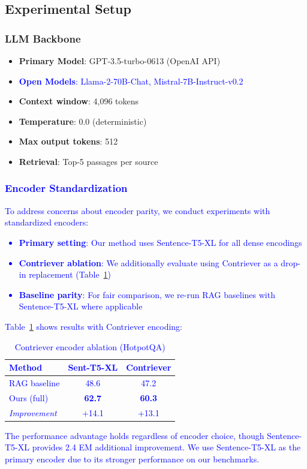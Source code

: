 \documentclass[10pt,twocolumn]{article}
\newcommand{\revision}[1]{\textcolor{blue}{#1}}
\begin{document}
\subsection{Experimental Setup}

\subsubsection{LLM Backbone}
\begin{itemize}
    \item \textbf{Primary Model}: GPT-3.5-turbo-0613 (OpenAI API)
    \item \revision{\textbf{Open Models}: Llama-2-70B-Chat, Mistral-7B-Instruct-v0.2}
    \item \textbf{Context window}: 4,096 tokens
    \item \textbf{Temperature}: 0.0 (deterministic)
    \item \textbf{Max output tokens}: 512
    \item \textbf{Retrieval}: Top-5 passages per source
\end{itemize}

\revision{
\subsubsection{Encoder Standardization}
\label{sec:encoder_standard}

To address concerns about encoder parity, we conduct experiments with standardized encoders:

\begin{itemize}
    \item \textbf{Primary setting}: Our method uses Sentence-T5-XL for all dense encodings
    \item \textbf{Contriever ablation}: We additionally evaluate using Contriever \cite{izacard2022contriever} as a drop-in replacement (Table~\ref{tab:contriever_ablation})
    \item \textbf{Baseline parity}: For fair comparison, we re-run RAG baselines with Sentence-T5-XL where applicable
\end{itemize}

Table~\ref{tab:contriever_ablation} shows results with Contriever encoding:

\begin{table}[h]
\centering
\caption{Contriever encoder ablation (HotpotQA)}
\label{tab:contriever_ablation}
\small
\begin{tabular}{@{}lcc@{}}
\toprule
\textbf{Method} & \textbf{Sent-T5-XL} & \textbf{Contriever} \\
\midrule
RAG baseline & 48.6 & 47.2 \\
Ours (full) & \textbf{62.7} & \textbf{60.3} \\
\midrule
\textit{Improvement} & +14.1 & +13.1 \\
\bottomrule
\end{tabular}
\end{table}

The performance advantage holds regardless of encoder choice, though Sentence-T5-XL provides 2.4 EM additional improvement. We use Sentence-T5-XL as the primary encoder due to its stronger performance on our benchmarks.
}
\end{document}
